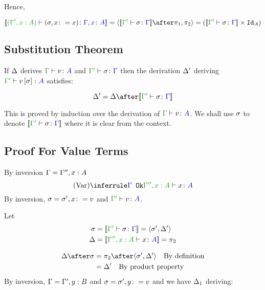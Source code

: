 \documentclass{report}
\begin{document}
Hence,

\begin{equation}
    \deno{\typerelation{(\G', x:A)}{(\si, x\setto x)}{\gax}} = \pr{\deno{\typerelation{\G'}{\si}{\G}}\after\p}{\pp} = (\deno{\typerelation{\G'}{\si}{\G}}\times \Id{A})
\end{equation}
\subsection{Substitution Theorem}

If $\Delta$ derives $\gtyperelation{v}{A}$ and $\typerelation{\G'}{\si}{\G}$ then the derivation $\Delta'$ deriving $\typerelation{\G'}{v\ssi}{A}$ satisfies:


\begin{framed}
    \begin{equation}
        \D' = \D \after\deno{\typerelation{\G'}{\si}{\G}}
    \end{equation}
    \centering
\end{framed}

This is proved by induction over the derivation of $\typerelation{\G}{v}{A}$.
We shall use $\sigma$ to denote $\deno{\typerelation{\G'}{\si}{\G}}$ where it is clear from the context.
\subsection{Proof For Value Terms}
By inversion $\Gamma = \Gamma'', x:A$
\begin{equation}
    \ntreeruleI{Var}{\ok{\G}}{\typerelation{\G'', x:A}{x}{A}}
\end{equation}
By inversion, $\sigma = \sigma', x\colon= v$ and $\typerelation{\G'}{v}{A}$.

Let 
\begin{align}
    \si &=\deno{\typerelation{\G'}{\si}{\G}} = \pr{\si'}{\D'}\\
    \D &=\deno{\typerelation{\G'', x:A}{x}{A}} = \pp\\
\end{align}

\begin{align}
    \D\after\si &= \pp\after\pr{\si'}{\D'}\qt{By definition}\\
    &= \D'\qt{By product property}
\end{align}
By inversion, $\Gamma = \Gamma', y:B$ and $\sigma = \sigma', y\colon= v$
and we have $\Delta_1$ deriving:
\end{document}
